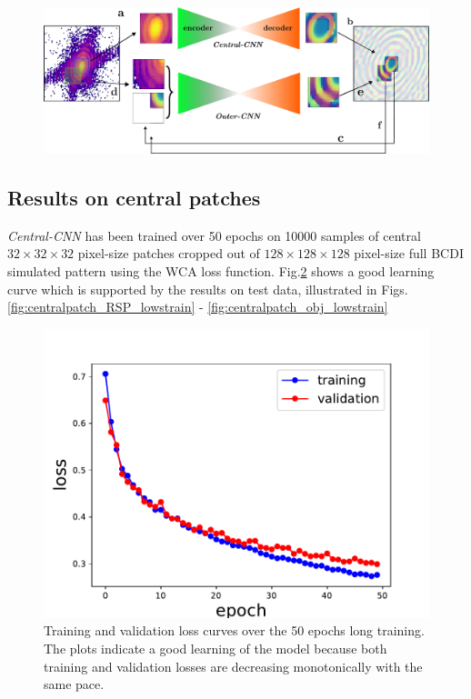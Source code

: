 \begin{figure}[H]
    \centering
    \includegraphics[width=\textwidth]{figures/Phasing/2models_patching.pdf}
    \caption{}
    
    \label{fig:2models}

\end{figure}

\subsection{Results on central patches}

\textit{Central-CNN} has been trained over 50 epochs on 10000 samples of central $32\times32\times32$ pixel-size patches 
cropped out of $128\times128\times128$ pixel-size full BCDI simulated pattern using the WCA loss function. 
Fig.\ref{fig:loss_3D_lowstrain} shows a good learning curve which is supported by the results on test data, illustrated 
in Figs. \ref{fig:centralpatch_RSP_lowstrain} - \ref{fig:centralpatch_obj_lowstrain}

\begin{figure}[H]
    \centering
    \includegraphics[width=\textwidth]{figures/Phasing/loss_central_patch.pdf}
    \caption{Training and validation loss curves over the 50 epochs long training. The plots indicate a good learning 
    of the model because both training and validation losses are decreasing monotonically with the same pace.}
    
    \label{fig:loss_3D_lowstrain}

\end{figure}

